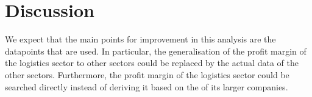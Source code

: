 \section{Discussion}\label{sec:discussion}
We expect that the main points for improvement in this analysis are the datapoints that are used. In particular, the generalisation of the profit margin of the logistics sector to other sectors could be replaced by the actual data of the other sectors. Furthermore, the profit margin of the logistics sector could be searched directly instead of deriving it based on the of its larger companies.